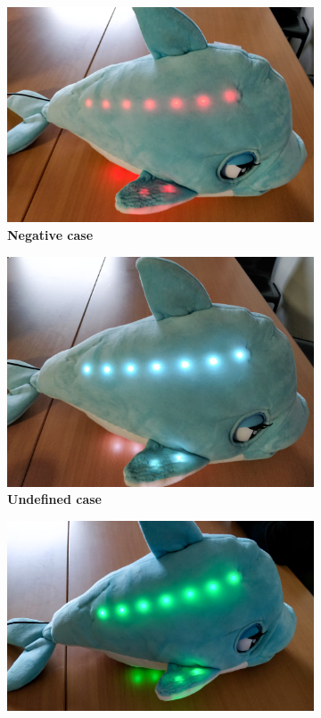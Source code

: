 \documentclass [12pt]{article}
\begin{document}
\begin{figure}[h!]
\centering
\hspace*{\fill}
\begin{subfigure}[tl]{0.3\linewidth}
\includegraphics[width=\linewidth]{NegativeCaseSam.jpg}
\caption{\textbf{Negative case}}
\end{subfigure}\hfill
\begin{subfigure}[tr]{0.3\linewidth}
\includegraphics[width=\linewidth]{UndefinedCaseSam.jpg}
\caption{\textbf{Undefined case}}
\end{subfigure}
\hspace*{\fill}
\begin{subfigure}[tr]{0.3\linewidth}
\includegraphics[width=\linewidth]{PositiveCaseSam.jpg}

\end{subfigure}
\end{figure}
\end{document}
